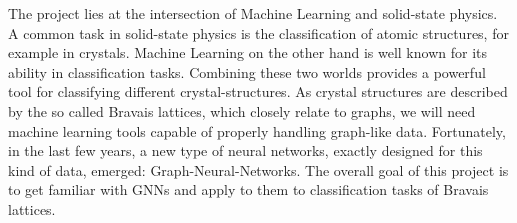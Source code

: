The project lies at the intersection of Machine Learning and solid-state physics. 
A common task in solid-state physics is the classification of atomic structures, for example in crystals.
Machine Learning on the other hand is well known for its ability in classification tasks. Combining these two worlds provides a powerful tool for 
classifying different crystal-structures. 
As crystal structures are described by the so called Bravais lattices, which closely relate to graphs, we will need machine learning tools capable of properly handling graph-like data.
Fortunately, in the last few years, a new type of neural networks, exactly designed for this kind of data, emerged: Graph-Neural-Networks.
The overall goal of this project is to get familiar with GNNs and apply to them to classification tasks of Bravais lattices.